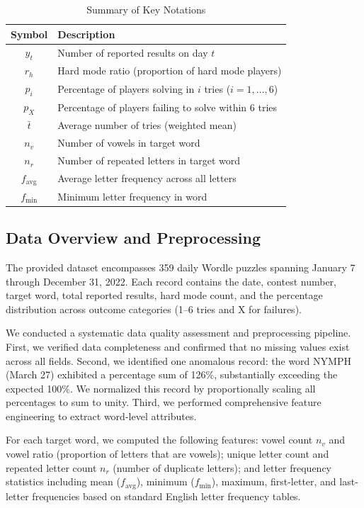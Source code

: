 \documentclass{mcmthesis}
\begin{document}
\begin{table}[H]
\centering
\caption{Summary of Key Notations}
\label{tab:notations}
\begin{tabular}{cl}
\toprule
\textbf{Symbol} & \textbf{Description} \\
\midrule
$y_t$ & Number of reported results on day $t$ \\
$r_h$ & Hard mode ratio (proportion of hard mode players) \\
$p_i$ & Percentage of players solving in $i$ tries ($i = 1,\ldots,6$) \\
$p_X$ & Percentage of players failing to solve within 6 tries \\
$\bar{t}$ & Average number of tries (weighted mean) \\
$n_v$ & Number of vowels in target word \\
$n_r$ & Number of repeated letters in target word \\
$f_{\text{avg}}$ & Average letter frequency across all letters \\
$f_{\text{min}}$ & Minimum letter frequency in word \\
\bottomrule
\end{tabular}
\end{table}

\subsection{Data Overview and Preprocessing}

The provided dataset encompasses 359 daily Wordle puzzles spanning January 7 through December 31, 2022. Each record contains the date, contest number, target word, total reported results, hard mode count, and the percentage distribution across outcome categories (1--6 tries and X for failures).

We conducted a systematic data quality assessment and preprocessing pipeline. First, we verified data completeness and confirmed that no missing values exist across all fields. Second, we identified one anomalous record: the word NYMPH (March 27) exhibited a percentage sum of 126\%, substantially exceeding the expected 100\%. We normalized this record by proportionally scaling all percentages to sum to unity. Third, we performed comprehensive feature engineering to extract word-level attributes.

For each target word, we computed the following features: vowel count $n_v$ and vowel ratio (proportion of letters that are vowels); unique letter count and repeated letter count $n_r$ (number of duplicate letters); and letter frequency statistics including mean ($f_{\text{avg}}$), minimum ($f_{\text{min}}$), maximum, first-letter, and last-letter frequencies based on standard English letter frequency tables.
\end{document}
